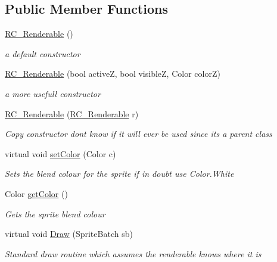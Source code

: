 \subsection*{Public Member Functions}
\begin{DoxyCompactItemize}
\item 
\mbox{\hyperlink{class_r_c___framework_1_1_r_c___renderable_af2c1d0e50a166ca2bd5137dafc7ab105}{R\+C\+\_\+\+Renderable}} ()
\begin{DoxyCompactList}\small\item\em a default constructor \end{DoxyCompactList}\item 
\mbox{\hyperlink{class_r_c___framework_1_1_r_c___renderable_a2f171037bc65e22991e1e4d32ecd8154}{R\+C\+\_\+\+Renderable}} (bool activeZ, bool visibleZ, Color colorZ)
\begin{DoxyCompactList}\small\item\em a more usefull constructor \end{DoxyCompactList}\item 
\mbox{\hyperlink{class_r_c___framework_1_1_r_c___renderable_aa5848d536a2dd1d0c8269a9ea48a06fb}{R\+C\+\_\+\+Renderable}} (\mbox{\hyperlink{class_r_c___framework_1_1_r_c___renderable}{R\+C\+\_\+\+Renderable}} r)
\begin{DoxyCompactList}\small\item\em Copy constructor dont know if it will ever be used since its a parent class \end{DoxyCompactList}\item 
virtual void \mbox{\hyperlink{class_r_c___framework_1_1_r_c___renderable_a73bf15681dc31644705e509c53f68833}{set\+Color}} (Color c)
\begin{DoxyCompactList}\small\item\em Sets the blend colour for the sprite if in doubt use Color.\+White \end{DoxyCompactList}\item 
Color \mbox{\hyperlink{class_r_c___framework_1_1_r_c___renderable_a4066c494d71a398ce2dfb6b932027243}{get\+Color}} ()
\begin{DoxyCompactList}\small\item\em Gets the sprite blend colour \end{DoxyCompactList}\item 
virtual void \mbox{\hyperlink{class_r_c___framework_1_1_r_c___renderable_acc26db34e382a25a989c4c0dd0354b23}{Draw}} (Sprite\+Batch sb)
\begin{DoxyCompactList}\small\item\em Standard draw routine which assumes the renderable knows where it is \end{DoxyCompactList}\item 

\end{DoxyCompactItemize}
